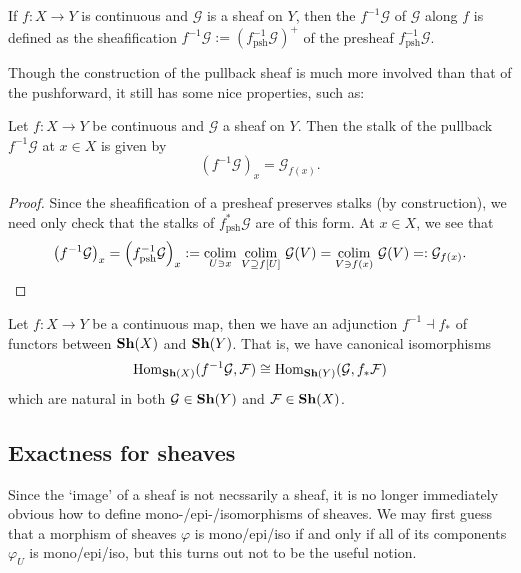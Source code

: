 \begin{defn}
	If $f:X \to Y$ is continuous and $\mathcal{G}$ is a sheaf on $Y$, then the  $f^{-1}\mathcal{G}$ of $\mathcal{G}$ along $f$ is defined as the sheafification $f^{-1}\mathcal{G} := \left(f^{-1}_\text{psh}\mathcal{G}\right)^+$ of the presheaf $f^{-1}_\text{psh}\mathcal{G}$.
\end{defn}


Though the construction of the pullback sheaf is much more involved than that of the pushforward, it still has some nice properties, such as:

\begin{prop}
	Let $f: X \to Y$ be continuous and $\mathcal{G}$ a sheaf on $Y$. Then the stalk of the pullback $f^{-1}\mathcal{G}$ at $x \in X$ is given by 
	\[
		\left(f^{-1}\mathcal{G}\right)_x = \mathcal{G}_{f(x)}.
	\]
\end{prop}
\begin{proof}
	Since the sheafification of a presheaf preserves stalks (by construction), we need only check that the stalks of $f^*_\text{psh}\mathcal{G}$ are of this form. At $x \in X$, we see that 
	\[
		\left(f^{-1}\mathcal{G}\right)_x = \left(f^{-1}_\text{psh}\mathcal{G}\right)_x := \mathop{\mathrm{colim}}\limits_{U \ni x}\,\mathop{\mathrm{colim}}\limits_{V \supseteq f[U]}\, \mathcal{G}(V) = \mathop{\mathrm{colim}}\limits_{V \ni f(x)}\, \mathcal{G}(V) =: \mathcal{G}_{f(x)}. \qedhere
	\]
\end{proof}

\begin{thm}
	\label{thm:pullback_pushforward_adjunction}
	Let $f:X \to Y$ be a continuous map, then we have an adjunction $f^{-1} \dashv f_*$ of functors between $\mathbf{Sh}(X)$ and $\mathbf{Sh}(Y)$. That is, we have canonical isomorphisms
	\[
		\mathrm{Hom}_{\mathbf{Sh}(X)}(f^{-1}\mathcal{G}, \mathcal{F}) \cong \mathrm{Hom}_{\mathbf{Sh}(Y)}(\mathcal{G}, f_*\mathcal{F})
	\]
	which are natural in both $\mathcal{G} \in \mathbf{Sh}(Y)$ and $\mathcal{F} \in \mathbf{Sh}(X)$.
\end{thm}


\subsection{Exactness for sheaves}
\label{subsec:A_3_exactness_for_sheaves}
Since the `image' of a sheaf is not necssarily a sheaf, it is no longer immediately obvious how to define mono-/epi-/isomorphisms of sheaves. We may first guess that a morphism of sheaves $\varphi$ is mono/epi/iso if and only if all of its components $\varphi_U$ is mono/epi/iso, but this turns out not to be the useful notion. 

